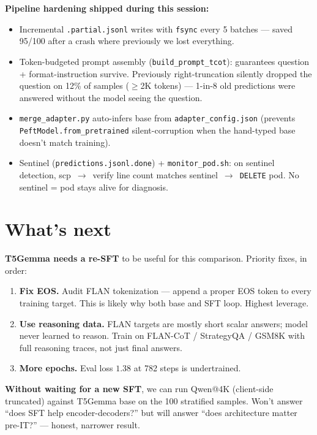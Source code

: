 \documentclass[11pt]{article}
\begin{document}
\textbf{Pipeline hardening shipped during this session:}
\begin{itemize}\setlength\itemsep{0pt}
  \item Incremental \texttt{.partial.jsonl} writes with \texttt{fsync} every 5 batches --- saved 95/100 after a crash where previously we lost everything.
  \item Token-budgeted prompt assembly (\texttt{build\_prompt\_tcot}): guarantees question + format-instruction survive. Previously right-truncation silently dropped the question on 12\% of samples ($\geq$2K tokens) --- 1-in-8 old predictions were answered without the model seeing the question.
  \item \texttt{merge\_adapter.py} auto-infers base from \texttt{adapter\_config.json} (prevents \texttt{PeftModel.from\_pretrained} silent-corruption when the hand-typed base doesn't match training).
  \item Sentinel (\texttt{predictions.jsonl.done}) + \texttt{monitor\_pod.sh}: on sentinel detection, scp~$\to$~verify line count matches sentinel~$\to$~\texttt{DELETE} pod. No sentinel = pod stays alive for diagnosis.
\end{itemize}

\section{What's next}

\textbf{T5Gemma needs a re-SFT} to be useful for this comparison. Priority fixes, in order:
\begin{enumerate}\setlength\itemsep{0pt}
  \item \textbf{Fix EOS.} Audit FLAN tokenization --- append a proper EOS token to every training target. This is likely why both base and SFT loop. Highest leverage.
  \item \textbf{Use reasoning data.} FLAN targets are mostly short scalar answers; model never learned to reason. Train on FLAN-CoT / StrategyQA / GSM8K with full reasoning traces, not just final answers.
  \item \textbf{More epochs.} Eval loss $1.38$ at 782 steps is undertrained.
\end{enumerate}

\textbf{Without waiting for a new SFT}, we can run Qwen@4K (client-side truncated) against T5Gemma base on the 100 stratified samples. Won't answer ``does SFT help encoder-decoders?'' but will answer ``does architecture matter pre-IT?'' --- honest, narrower result.
\end{document}
